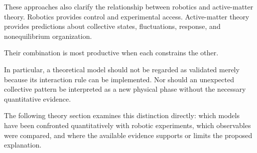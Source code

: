 These approaches
also clarify the
relationship between
robotics and
active-matter theory.
Robotics provides
control and
experimental access.
Active-matter theory
provides predictions
about collective
states, fluctuations,
response, and
nonequilibrium
organization.

Their combination
is most productive
when each constrains
the other.

In particular,
a theoretical model
should not be regarded
as validated merely
because its
interaction rule
can be implemented.
Nor should an
unexpected collective
pattern be interpreted
as a new physical
phase without
the necessary
quantitative evidence.



The following
theory section
examines this
distinction directly:
which models have
been confronted
quantitatively
with robotic
experiments,
which observables
were compared,
and where the
available evidence
supports or
limits the
proposed explanation.

